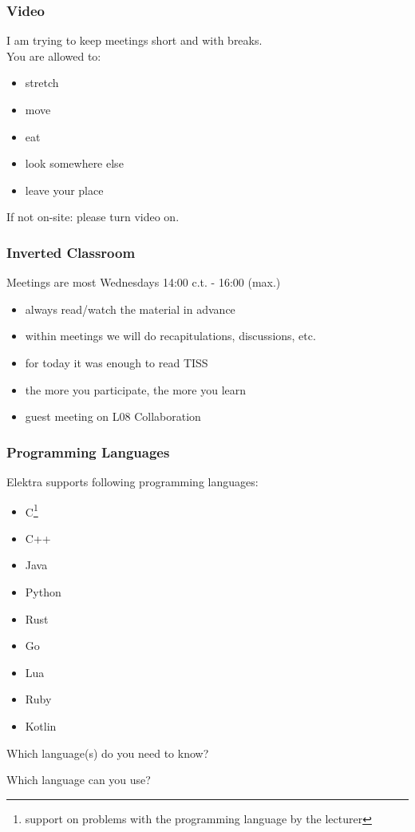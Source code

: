 \begin{assignment}
	\frametitle{Video}
	I am trying to keep meetings short and with breaks. \\
	You are allowed to:
	\begin{itemize}
		\item stretch
		\item move
		\item eat
		\item look somewhere else
		\item leave your place
	\end{itemize}

	\begin{task}
	If not on-site: please turn video on.
	\end{task}
\end{assignment}

\begin{frame}
	\frametitle{Inverted Classroom}
	Meetings are most Wednesdays 14:00 c.t. - 16:00 (max.)

	\begin{itemize}[<+-| alert@+>]
		\item always read/watch the material in advance
		\item within meetings we will do recapitulations, discussions, etc.
		\item for today it was enough to read TISS
		\item the more you participate, the more you learn
		\item guest meeting on L08 Collaboration
	\end{itemize}
\end{frame}

\begin{frame}
	\frametitle{Programming Languages}
	Elektra supports following programming languages:
	\begin{itemize}
		\item C\footnote{support on problems with the programming language by the lecturer}
		\item C++\footnotemark[1]
		\item Java\footnotemark[1]
		\item Python\footnotemark[1]
		\item Rust
		\item Go
		\item Lua
		\item Ruby
		\item Kotlin
	\end{itemize}

	\begin{quest}[1]
	Which language(s) do you need to know?
	\end{quest}

	\begin{quest}[2]
	Which language can you use?
	\end{quest}
\end{frame}

